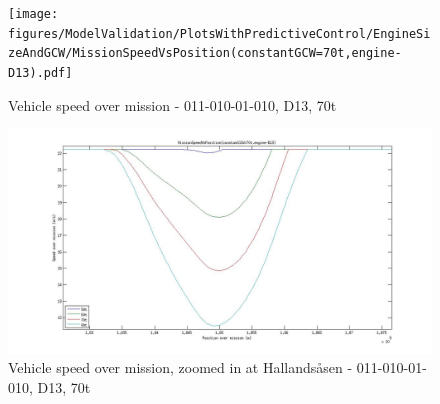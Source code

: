 \documentclass[ExampleMasters.tex]{subfiles}
\begin{document}
	\begin{figure}
	\centering
	\texttt{[image: figures/ModelValidation/PlotsWithPredictiveControl/EngineSizeAndGCW/MissionSpeedVsPosition(constantGCW=70t,engine-D13).pdf]}
	\caption{Vehicle speed over mission - 011-010-01-010, D13, 70t}
	\label{speedEngineDownsizingPredictiveSoC}
	\end{figure}
	\begin{figure}
	\centering
	\includegraphics[width=\linewidth]{figures/ModelValidation/PlotsWithPredictiveControl/EngineSizeAndGCW/MissionSpeedZoomedInD13.jpg}
	\caption{Vehicle speed over mission, zoomed in at Hallands\aa sen - 011-010-01-010, D13, 70t}
	\label{speedZoomedEngineDownsizingPredictiveSoC}
	\end{figure}
\end{document}
